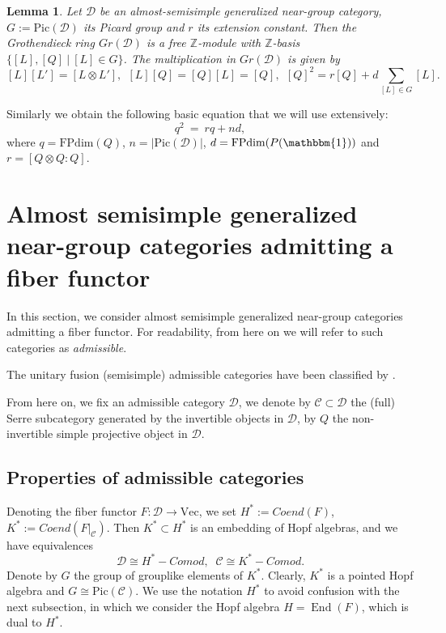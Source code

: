 \documentclass{amsart}
\theoremstyle{plain}%
\newtheorem{lemma}{Lemma}[subsection]
\theoremstyle{remark}
\newcommand{\C}{\mathcal{C}}
\newcommand{\1}{\mathbbm{1}}
\newcommand{\D}{\mathcal{D}}
\newcommand{\Z}{\mathbb{Z}}
\newcommand{\FPdim}{\mathrm{FPdim}}
\newcommand{\Vect}{\mathrm{Vec}}
\newcommand{\pic}{\mathrm{Pic}}
\begin{document}
    \begin{lemma}\label{cor:groth_ring}
        Let $\D$ be an almost-semisimple generalized near-group category, $G:=\pic(\D)$ its Picard group and $r$ its extension constant.
        Then the Grothendieck ring $Gr(\D)$ is a free $\Z$-module with $\Z$-basis $\{[L], [Q]~|~[L]\in G\}$. The multiplication in $Gr(\D)$ is given by $$[L][L']=[L \otimes L'], ~~[L][Q]=[Q][L]=[Q], ~~[Q]^2=r[Q]+d\sum_{[L]\in G} [L].$$ 
    \end{lemma}
    Similarly we obtain the following basic equation that we will use extensively:
    \begin{equation}\label{eq:q_square}
        q^2~=~rq+nd,
    \end{equation}
    where $q=\FPdim(Q)$, $n = |\pic(\D)|$, $d = \FPdim(P(\1))$ and $r = [Q\otimes Q:Q]$.

\section{Almost semisimple generalized near-group categories admitting a fiber functor}\label{sec: integral near-group categories}
    In this section, we consider almost semisimple generalized near-group categories admitting a fiber functor. For readability, from here on we will refer to such categories as \textit{admissible}.

The unitary fusion (semisimple) admissible categories have been classified by \cite{Iz, TY}. 

   From here on, we fix an admissible category $\D$, we denote by $\C\subset \D$ the (full) Serre subcategory generated by the invertible objects in $\D$, by $Q$ the non-invertible simple projective object in $\D$. %

    \subsection{Properties of admissible categories}
        Denoting the fiber functor $F: \D\to \Vect$, we set
        $H^*:=Coend(F)$, $ K^*:=Coend(F\rvert_{\C})$. Then $K^*\subset H^*$ is an embedding of Hopf algebras, and we have equivalences $$\D\cong H^*-Comod, \;\;\C\cong K^*-Comod.$$  Denote by $G$ the group of grouplike elements of $K^*$. Clearly, $K^*$ is a pointed Hopf algebra and $G \cong \pic(\C)$. We use the notation $H^*$ to avoid confusion with the next subsection, in which we consider the Hopf algebra $H = \operatorname{End}(F)$, which is dual to $H^*$. 
\end{document}
